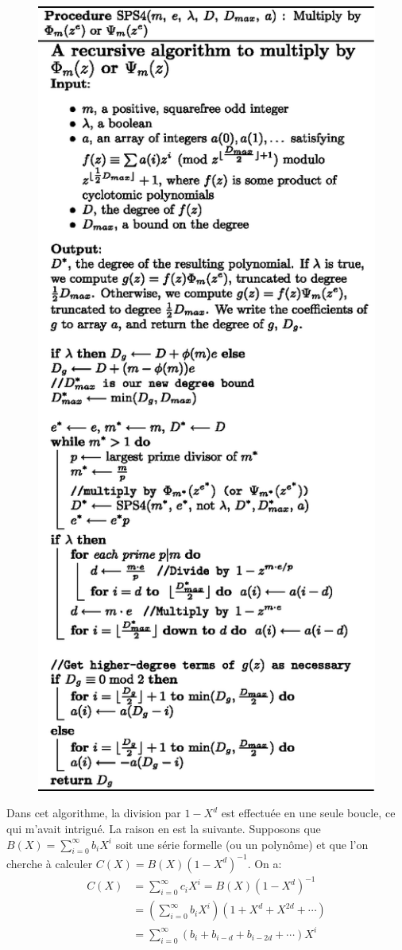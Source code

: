 \documentclass{article}
\theoremstyle{break}                  %
\begin{document}
\begin{figure}[H]
	\centering
	\includegraphics{cyclotomic-highperf-sps4.eps}
\end{figure}

Dans cet algorithme, la division par $1- X^d$ est effectuée en une seule boucle, ce qui m'avait intrigué. La raison en est la suivante. Supposons que $B(X) = \sum_{i=0}^\infty b_i X^i$ soit une série formelle (ou un polynôme) et que l'on cherche à calculer $C(X) = B(X) (1-X^d)^{-1}$. On a:
\begin{align*}
	C(X) &= \sum_{i=0}^\infty c_i X^i=B(X) (1-X^d)^{-1}\\
	&= \left(\sum_{i=0}^\infty b_i X^i\right)\left(1 + X^d + X^{2d} + \cdots\right)\\
	&= \sum_{i=0}^\infty\left(b_i + b_{i-d} + b_{i-2d} + \cdots\right) X^i
\end{align*}
\end{document}
